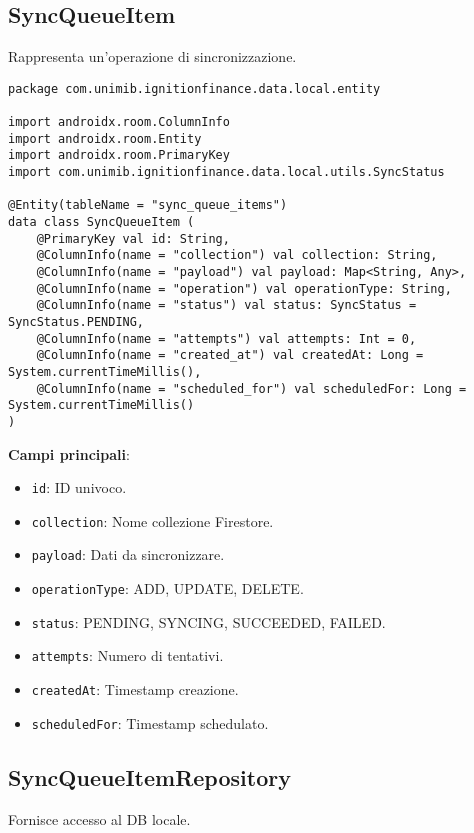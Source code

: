 \subsection{SyncQueueItem}\label{subsec:syncqueueitem} Rappresenta un'operazione di sincronizzazione.

\begin{lstlisting}[caption=SyncQueueItem.kt, label=lst:syncqueueitem, basicstyle=\ttfamily\scriptsize, breaklines=true, breakatwhitespace=true, tabsize=4, backgroundcolor=\color{codegray}]
package com.unimib.ignitionfinance.data.local.entity

import androidx.room.ColumnInfo
import androidx.room.Entity
import androidx.room.PrimaryKey
import com.unimib.ignitionfinance.data.local.utils.SyncStatus

@Entity(tableName = "sync_queue_items")
data class SyncQueueItem (
    @PrimaryKey val id: String,
    @ColumnInfo(name = "collection") val collection: String,
    @ColumnInfo(name = "payload") val payload: Map<String, Any>,
    @ColumnInfo(name = "operation") val operationType: String,
    @ColumnInfo(name = "status") val status: SyncStatus = SyncStatus.PENDING,
    @ColumnInfo(name = "attempts") val attempts: Int = 0,
    @ColumnInfo(name = "created_at") val createdAt: Long = System.currentTimeMillis(),
    @ColumnInfo(name = "scheduled_for") val scheduledFor: Long = System.currentTimeMillis()
)
\end{lstlisting}

\textbf{Campi principali}:
\begin{itemize}
    \item \texttt{id}: ID univoco.
    \item \texttt{collection}: Nome collezione Firestore.
    \item \texttt{payload}: Dati da sincronizzare.
    \item \texttt{operationType}: ADD, UPDATE, DELETE.
    \item \texttt{status}: PENDING, SYNCING, SUCCEEDED, FAILED.
    \item \texttt{attempts}: Numero di tentativi.
    \item \texttt{createdAt}: Timestamp creazione.
    \item \texttt{scheduledFor}: Timestamp schedulato.
\end{itemize}

\subsection{SyncQueueItemRepository}\label{subsec:syncqueueitemrepository} Fornisce accesso al DB locale.

